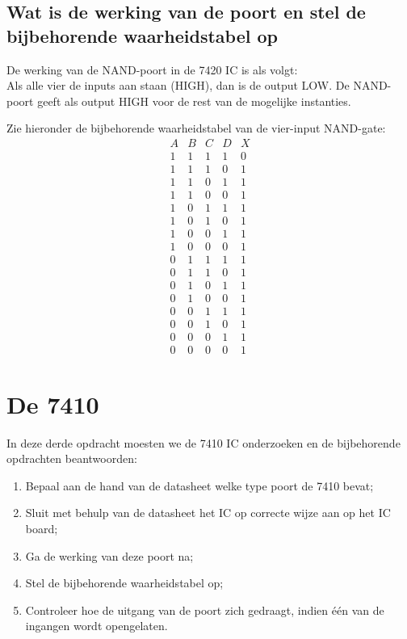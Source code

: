 \documentclass[12pt]{article}
\begin{document}
\pagebreak
\subsection{Wat is de werking van de poort en stel de bijbehorende waarheidstabel op}
De werking van de NAND-poort in de 7420 IC is als volgt: \\
Als alle vier de inputs aan staan (HIGH), dan is de output LOW. De NAND-poort geeft als output HIGH voor de rest van de mogelijke instanties.

Zie hieronder de bijbehorende waarheidstabel van de vier-input NAND-gate:
\begin{displaymath}
    \begin{array}{|c|c|c|c||c|}
    A & B & C & D & X \\ %
    \hline %
    1 & 1 & 1 & 1 & 0 \\
    1 & 1 & 1 & 0 & 1 \\
    1 & 1 & 0 & 1 & 1 \\
    1 & 1 & 0 & 0 & 1 \\
    1 & 0 & 1 & 1 & 1 \\
    1 & 0 & 1 & 0 & 1 \\
    1 & 0 & 0 & 1 & 1 \\
    1 & 0 & 0 & 0 & 1 \\
    0 & 1 & 1 & 1 & 1 \\
    0 & 1 & 1 & 0 & 1 \\
    0 & 1 & 0 & 1 & 1 \\
    0 & 1 & 0 & 0 & 1 \\
    0 & 0 & 1 & 1 & 1 \\
    0 & 0 & 1 & 0 & 1 \\
    0 & 0 & 0 & 1 & 1 \\
    0 & 0 & 0 & 0 & 1   
    \end{array}
    \end{displaymath}
\pagebreak
\section{De 7410}
In deze derde opdracht moesten we de 7410 IC onderzoeken en de bijbehorende opdrachten beantwoorden:

\begin{enumerate}
    \item Bepaal aan de hand van de datasheet welke type poort de 7410 bevat;
    \item Sluit met behulp van de datasheet het IC op correcte wijze aan op het IC board;
    \item Ga de werking van deze poort na;
    \item Stel de bijbehorende waarheidstabel op;
    \item Controleer hoe de uitgang van de poort zich gedraagt, indien één van de ingangen wordt opengelaten. 
\end{enumerate}
\end{document}
